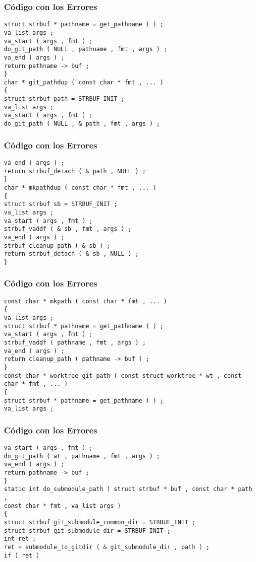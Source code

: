 \documentclass{beamer}
\begin{document}
\begin{frame}[fragile]
\frametitle{C\'odigo con los Errores}
\begin{verbatim}
struct strbuf * pathname = get_pathname ( ) ; 
va_list args ; 
va_start ( args , fmt ) ; 
do_git_path ( NULL , pathname , fmt , args ) ; 
va_end ( args ) ; 
return pathname -> buf ; 
} 
char * git_pathdup ( const char * fmt , ... ) 
{ 
struct strbuf path = STRBUF_INIT ; 
va_list args ; 
va_start ( args , fmt ) ; 
do_git_path ( NULL , & path , fmt , args ) ; 
\end{verbatim}
\end{frame}
\begin{frame}[fragile]
\frametitle{C\'odigo con los Errores}
\begin{verbatim}
va_end ( args ) ; 
return strbuf_detach ( & path , NULL ) ; 
} 
char * mkpathdup ( const char * fmt , ... ) 
{ 
struct strbuf sb = STRBUF_INIT ; 
va_list args ; 
va_start ( args , fmt ) ; 
strbuf_vaddf ( & sb , fmt , args ) ; 
va_end ( args ) ; 
strbuf_cleanup_path ( & sb ) ; 
return strbuf_detach ( & sb , NULL ) ; 
} 
\end{verbatim}
\end{frame}
\begin{frame}[fragile]
\frametitle{C\'odigo con los Errores}
\begin{verbatim}
const char * mkpath ( const char * fmt , ... ) 
{ 
va_list args ; 
struct strbuf * pathname = get_pathname ( ) ; 
va_start ( args , fmt ) ; 
strbuf_vaddf ( pathname , fmt , args ) ; 
va_end ( args ) ; 
return cleanup_path ( pathname -> buf ) ; 
} 
const char * worktree_git_path ( const struct worktree * wt , const char * fmt , ... ) 
{ 
struct strbuf * pathname = get_pathname ( ) ; 
va_list args ; 
\end{verbatim}
\end{frame}
\begin{frame}[fragile]
\frametitle{C\'odigo con los Errores}
\begin{verbatim}
va_start ( args , fmt ) ; 
do_git_path ( wt , pathname , fmt , args ) ; 
va_end ( args ) ; 
return pathname -> buf ; 
} 
static int do_submodule_path ( struct strbuf * buf , const char * path , 
const char * fmt , va_list args ) 
{ 
struct strbuf git_submodule_common_dir = STRBUF_INIT ; 
struct strbuf git_submodule_dir = STRBUF_INIT ; 
int ret ; 
ret = submodule_to_gitdir ( & git_submodule_dir , path ) ; 
if ( ret ) 
\end{verbatim}
\end{frame}
\end{document}
